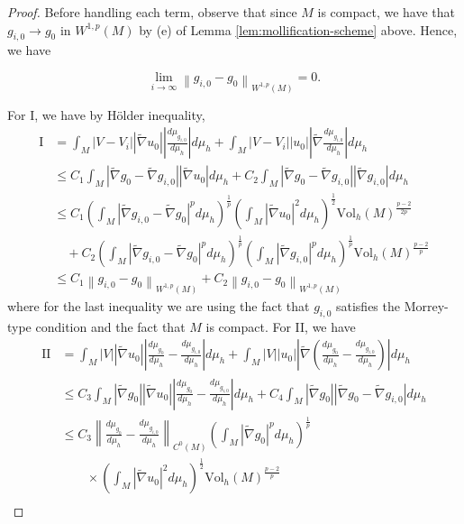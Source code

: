\documentclass[12pt]{amsart}
\newcommand{\hdel}{\tilde{\nabla}}
\theoremstyle{remark}
\numberwithin{equation}{section}
\begin{document}
\begin{proof}
    Before handling each term, observe that since $M$ is compact, we have that $g_{i,0} \to g_0$ in $W^{1,p}(M)$ by (e) of Lemma \ref{lem:mollification-scheme} above. Hence, we have

    \begin{equation*}
        \lim\limits_{i\to\infty}\left\lVert g_{i,0} - g_0\right\rVert_{W^{1,p}(M)} = 0.
    \end{equation*}

    For I, we have by H\"older inequality,
    \begin{align*}
        \text{I} &= \int_M |V - V_i||\hdel u_0|\left|\frac{d\mu_{g_{i,0}}}{d\mu_h}\right|d\mu_h + \int_M |V - V_i||u_0|\left|\hdel\frac{d\mu_{g_{i,0}}}{d\mu_h}\right|d\mu_h \nonumber \\
        &\leq C_1\int_M |\hdel g_0 - \hdel g_{i,0}||\hdel u_0|d\mu_h + C_2\int_M |\hdel g_0 - \hdel g_{i,0}||\hdel g_{i,0}|d\mu_h \nonumber \\
        &\leq C_1\left(\int_M |\hdel g_{i,0} - \hdel g_0|^pd\mu_h\right)^\frac{1}{p}\left(\int_M |\hdel u_0|^2d\mu_h\right)^\frac{1}{2}\text{Vol}_h(M)^\frac{p-2}{2p} \nonumber \\
        &\quad + C_2\left(\int_M |\hdel g_{i,0} - \hdel g_0|^pd\mu_h\right)^\frac{1}{p}\left(\int_M |\hdel g_{i,0}|^pd\mu_h\right)^\frac{1}{p}\text{Vol}_h(M)^\frac{p-2}{p} \nonumber \\
        &\leq C_1\left\lVert g_{i,0} - g_0\right\rVert_{W^{1,p}(M)} + C_2\left\lVert g_{i,0} - g_0\right\rVert_{W^{1,p}(M)}
    \end{align*}
    where for the last inequality we are using the fact that $g_{i,0}$ satisfies the Morrey-type condition and the fact that $M$ is compact. For II, we have
    \begin{align*}
        \text{II} &= \int_M |V||\hdel u_0|\left|\frac{d\mu_{g_0}}{d\mu_h} - \frac{d\mu_{g_{i,0}}}{d\mu_h}\right|d\mu_h + \int_M |V||u_0|\left|\hdel\left(\frac{d\mu_{g_0}}{d\mu_h}-\frac{d\mu_{g_{i,0}}}{d\mu_h}\right)\right|d\mu_h \nonumber \\
        &\leq C_3\int_M |\hdel g_0||\hdel u_0|\left|\frac{d\mu_{g_0}}{d\mu_h} - \frac{d\mu_{g_{i,0}}}{d\mu_h}\right|d\mu_h + C_4\int_M |\hdel g_0||\hdel g_0 - \hdel g_{i,0}|d\mu_h \nonumber \\
        &\leq C_3\left\lVert \frac{d\mu_{g_0}}{d\mu_h} - \frac{d\mu_{g_{i,0}}}{d\mu_h}\right\rVert_{C^0(M)}\left(\int_M |\hdel g_0|^pd\mu_h\right)^\frac{1}{p} \nonumber \\
        &\qquad \times\left(\int_M |\hdel u_0|^2d\mu_h\right)^\frac{1}{2}\text{Vol}_h(M)^\frac{p-2}{p} \nonumber \\

\end{align*}
\end{proof}
\end{document}

